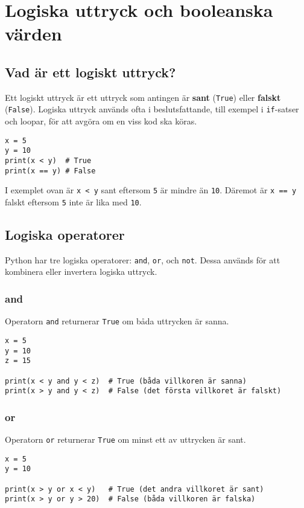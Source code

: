 \section{Logiska uttryck och booleanska värden}
\label{section:boolean}
\subsection{Vad är ett logiskt uttryck?}
Ett logiskt uttryck är ett uttryck som antingen är \textbf{sant} (\texttt{True}) eller \textbf{falskt} (\texttt{False}). Logiska uttryck används ofta i beslutsfattande, till exempel i \texttt{if}-satser och loopar, för att avgöra om en viss kod ska köras.

\begin{lstlisting}[title=Exempel på logiska uttryck]
x = 5
y = 10
print(x < y)  # True
print(x == y) # False
\end{lstlisting}

I exemplet ovan är \texttt{x < y} sant eftersom \texttt{5} är mindre än \texttt{10}. Däremot är \texttt{x == y} falskt eftersom \texttt{5} inte är lika med \texttt{10}.


\subsection{Logiska operatorer}
Python har tre logiska operatorer: \texttt{and}, \texttt{or}, och \texttt{not}. Dessa används för att kombinera eller invertera logiska uttryck.

\subsubsection{\textbf{and}}
Operatorn \texttt{and} returnerar \texttt{True} om båda uttrycken är sanna.
\begin{lstlisting}[title=Exempel med \texttt{and}]
x = 5
y = 10
z = 15

print(x < y and y < z)  # True (båda villkoren är sanna)
print(x > y and y < z)  # False (det första villkoret är falskt)
\end{lstlisting}

\subsubsection{\textbf{or}}
Operatorn \texttt{or} returnerar \texttt{True} om minst ett av uttrycken är sant.
\begin{lstlisting}[title=Exempel med \texttt{or}]
x = 5
y = 10

print(x > y or x < y)   # True (det andra villkoret är sant)
print(x > y or y > 20)  # False (båda villkoren är falska)
\end{lstlisting}

